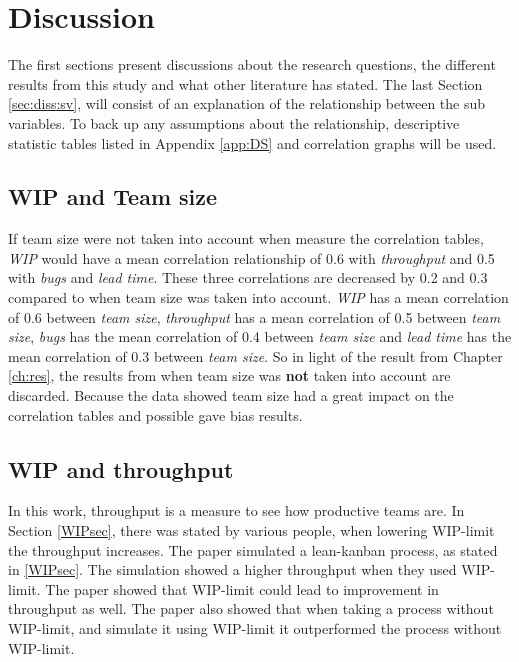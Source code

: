 \documentclass[UKenglish]{ifimaster}  %
\begin{document}
\chapter{Discussion}
\label{ch:dis}
The first sections present discussions about  the research questions, the different results from this study and what other literature has stated. The last Section \ref{sec:diss:sv}, will consist of an explanation of the relationship between the sub variables. To back up any assumptions about the relationship, descriptive statistic tables listed in Appendix \ref{app:DS} and correlation graphs will be used. 


\section{WIP and Team size}
If team size were not taken into account when measure the correlation tables, \textit{WIP} would have a mean correlation relationship of 0.6 with \textit{throughput} and 0.5 with \textit{bugs} and \textit{lead time}. These three correlations are decreased by 0.2  and 0.3 compared to when team size was taken into account.  \textit{WIP} has a mean correlation of 0.6 between \textit{team size}, \textit{throughput} has a mean correlation of 0.5 between \textit{team size}, \textit{bugs} has the mean correlation of 0.4 between \textit{team size} and \textit{lead time} has the mean correlation of 0.3 between \textit{team size}. So in light of the result from Chapter \ref{ch:res}, the results from when team size was \textbf{not} taken into account are discarded. Because the data showed team size had a great impact on the correlation tables and possible gave bias results.




\section{WIP and throughput} 
\vspace{-0.5em}
In this work, throughput is a measure to see how productive teams are. In Section \ref{WIPsec}, there was stated by various people, when lowering WIP-limit the {throughput} increases. The paper \parencite{DavidAnderson} simulated a  lean-kanban process, as stated in \ref{WIPsec}. The simulation showed a higher throughput when they used WIP-limit. The paper \parencite{SMR:SMR1599} showed that WIP-limit could lead to improvement in throughput as well. The paper also showed that when taking a process without WIP-limit, and simulate it using WIP-limit it outperformed the process without WIP-limit.
\end{document}

